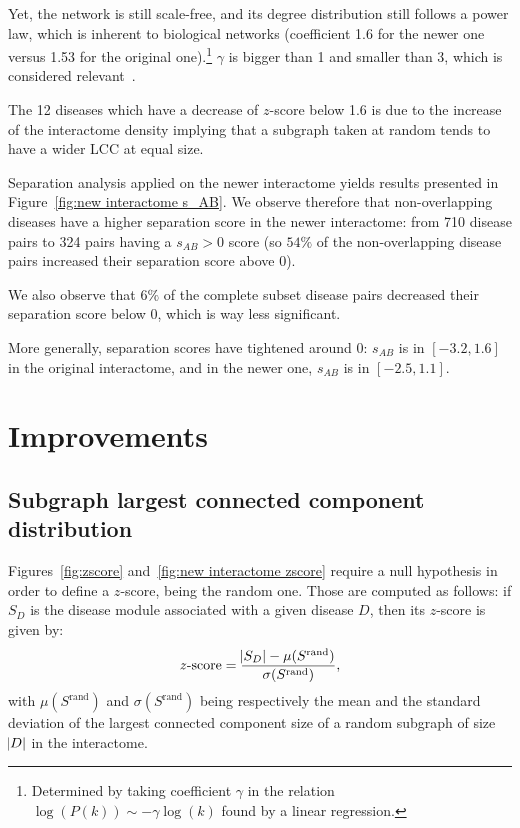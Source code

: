 \documentclass[letterpaper]{article}
\begin{document}
	Yet, the network is still scale-free, and its degree distribution still follows a power law, which is inherent to
	biological networks (coefficient 1.6 for the newer one versus 1.53 for the original one).\footnote{Determined by
	taking coefficient $\gamma$ in the relation $\log(P(k)) \sim -\gamma\log(k)$ found by a linear regression.}
	$\gamma$ is bigger than 1 and smaller than 3, which is considered
	relevant~\citep{UnderstandingTheCellFunctionalOrganization,InteractomeNetworksAndHumanDisease}.

	The 12 diseases which have a decrease of $z$-score below 1.6 is due to the increase of the interactome density implying
	that a subgraph taken at random tends to have a wider LCC at equal size.

	Separation analysis applied on the newer interactome yields results presented in Figure~\ref{fig:new interactome s_AB}.
	We observe therefore that non-overlapping diseases have a higher separation score in the newer interactome: from 710
	disease pairs to 324 pairs having a $s_{AB} > 0$ score (so $54\%$ of the non-overlapping disease pairs increased their
	separation score above 0).

	We also observe that $6\%$ of the complete subset disease pairs decreased their separation score below 0, which is way
	less significant.

	More generally, separation scores have tightened around 0: $s_{AB}$ is in $[-3.2, 1.6]$ in the original interactome, and
	in the newer one, $s_{AB}$ is in $[-2.5, 1.1]$.

\section{Improvements}

	\subsection{Subgraph largest connected component distribution}
	Figures~\ref{fig:zscore} and~\ref{fig:new interactome zscore} require a null hypothesis in order to define a $z$-score,
	being the random one. Those are computed as follows: if $S_D$ is the disease module associated with a given disease $D$,
	then its $z$-score is given by:
	\begin{equation}
		z\text{-score} = \frac {\abs {S_D} - \mu(S^{\text{rand}})}{\sigma(S^{\text{rand}})},
	\end{equation}
	with $\mu(S^{\text{rand}})$ and $\sigma(S^{\text{rand}})$ being respectively the mean and the
	standard deviation of the largest connected component size of a random subgraph of size $\abs D$
	in the interactome.
\end{document}
